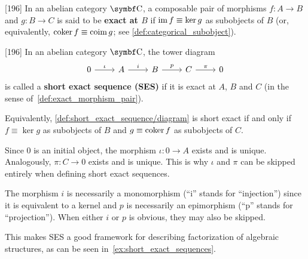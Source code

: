 \begin{definition}\label{def:exact_morphism_pair}\cite{MacLane1994}[196]
  In an abelian category \( \Bold C \), a composable pair of morphisms \( f: A \to B \) and \( g: B \to C \) is said to be \textbf{exact at \( B \)} if \( \operatorname{im} f \equiv \ker g \) as subobjects of \( B \) (or, equivalently, \( \operatorname{coker} f \equiv \operatorname{coim} g \); see \cref{def:categorical_subobject}).
\end{definition}

\begin{definition}\label{def:short_exact_sequence}\cite{MacLane1994}[196]
  In an abelian category \( \Bold C \), the tower diagram
  \begin{equation}\label{def:short_exact_sequence/diagram}
    \begin{tikzcd}[baseline=(current bounding box.center)]
      0 \arrow[r, "\iota"] & A \arrow[r, "i"] & B \arrow[r, "p"] & C \arrow[r, "\pi"] & 0
    \end{tikzcd}
  \end{equation}
  is called a \textbf{short exact sequence (SES)} if it is exact at \( A \), \( B \) and \( C \) (in the sense of~\cref{def:exact_morphism_pair}).

  Equivalently, \cref{def:short_exact_sequence/diagram} is short exact if and only if \( f \equiv \ker g \) as subobjects of \( B \) and \( g \equiv \operatorname{coker} f \) as subobjects of \( C \).
\end{definition}

\begin{note}\label{note:short_exact_sequence_factorization}
  Since \( 0 \) is an initial object, the morphism \( \iota: 0 \to A \) exists and is unique. Analogously, \( \pi: C \to 0 \) exists and is unique. This is why \( \iota \) and \( \pi \) can be skipped entirely when defining short exact sequences.

  The morphism \( i \) is necessarily a monomorphism (\enquote{i} stands for \enquote{injection}) since it is equivalent to a kernel and \( p \) is necessarily an epimorphism (\enquote{p} stands for \enquote{projection}). When either \( i \) or \( p \) is obvious, they may also be skipped.

  This makes SES a good framework for describing factorization of algebraic structures, as can be seen in~\cref{ex:short_exact_sequences}.
\end{note}

